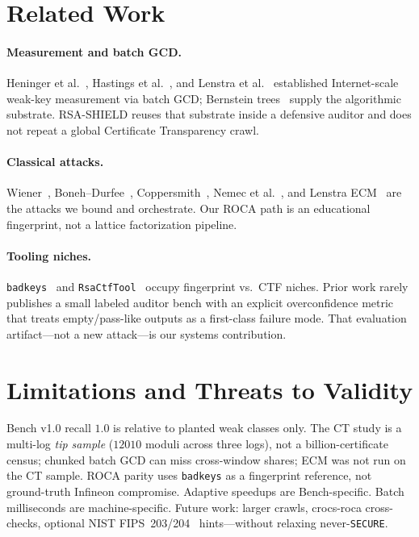 \documentclass[conference]{IEEEtran}
\begin{document}
\section{Related Work}
\paragraph{Measurement and batch GCD.}
Heninger et al.~\cite{heninger2012mining}, Hastings et al.~\cite{hastings2016weak}, and Lenstra et al.~\cite{lenstra2012ron} established Internet-scale weak-key measurement via batch GCD; Bernstein trees~\cite{bernstein2004find} supply the algorithmic substrate. RSA-SHIELD reuses that substrate inside a defensive auditor and does not repeat a global Certificate Transparency crawl.

\paragraph{Classical attacks.}
Wiener~\cite{wiener1990cryptanalysis}, Boneh--Durfee~\cite{boneh2000cryptanalysis}, Coppersmith~\cite{coppersmith1997small}, Nemec et al.~\cite{nemec2017return}, and Lenstra ECM~\cite{lenstra1987factoring} are the attacks we bound and orchestrate. Our ROCA path is an educational fingerprint, not a lattice factorization pipeline.

\paragraph{Tooling niches.}
\texttt{badkeys}~\cite{bock2022badkeys} and \texttt{RsaCtfTool}~\cite{rsactftool} occupy fingerprint vs.\ CTF niches. Prior work rarely publishes a small labeled auditor bench with an explicit overconfidence metric that treats empty/pass-like outputs as a first-class failure mode. That evaluation artifact---not a new attack---is our systems contribution.

\section{Limitations and Threats to Validity}
Bench v1.0 recall $1.0$ is relative to planted weak classes only. The CT study is a multi-log \emph{tip sample} ($12010$ moduli across three logs), not a billion-certificate census; chunked batch GCD can miss cross-window shares; ECM was not run on the CT sample. ROCA parity uses \texttt{badkeys} as a fingerprint reference, not ground-truth Infineon compromise. Adaptive speedups are Bench-specific. Batch milliseconds are machine-specific. Future work: larger crawls, crocs-roca cross-checks, optional NIST FIPS~203/204~\cite{nist2024fips203,nist2024fips204} hints---without relaxing never-\texttt{SECURE}.
\end{document}
